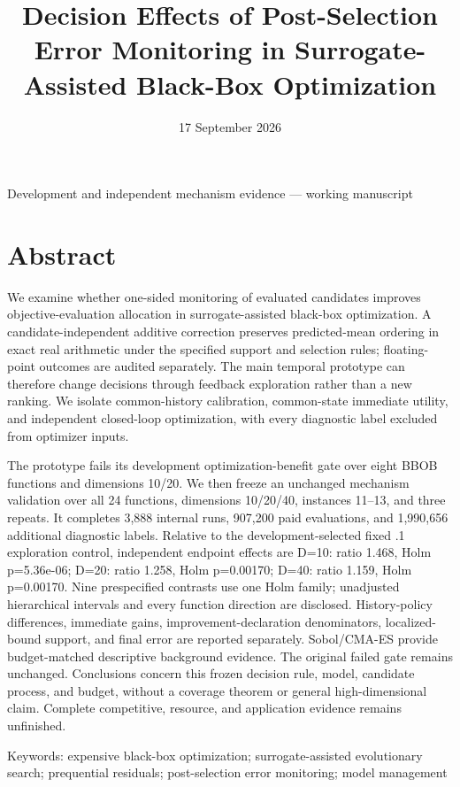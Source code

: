 \documentclass[11pt,a4paper]{article}
\title{Decision Effects of Post-Selection Error Monitoring in
Surrogate-Assisted Black-Box Optimization}
\author{}
\date{17 September 2026}
\begin{document}
\maketitle
\begin{center}Development and independent mechanism evidence --- working
manuscript\end{center}
\hypertarget{abstract}{%
\section{Abstract}\label{abstract}}

We examine whether one-sided monitoring of evaluated candidates improves
objective-evaluation allocation in surrogate-assisted black-box
optimization. A candidate-independent additive correction preserves
predicted-mean ordering in exact real arithmetic under the specified
support and selection rules; floating-point outcomes are audited
separately. The main temporal prototype can therefore change decisions
through feedback exploration rather than a new ranking. We isolate
common-history calibration, common-state immediate utility, and
independent closed-loop optimization, with every diagnostic label
excluded from optimizer inputs.

The prototype fails its development optimization-benefit gate over eight
BBOB functions and dimensions 10/20. We then freeze an unchanged
mechanism validation over all 24 functions, dimensions 10/20/40,
instances 11--13, and three repeats. It completes 3,888 internal runs,
907,200 paid evaluations, and 1,990,656 additional diagnostic labels.
Relative to the development-selected fixed .1 exploration control,
independent endpoint effects are D=10: ratio 1.468, Holm p=5.36e-06;
D=20: ratio 1.258, Holm p=0.00170; D=40: ratio 1.159, Holm p=0.00170.
Nine prespecified contrasts use one Holm family; unadjusted hierarchical
intervals and every function direction are disclosed. History-policy
differences, immediate gains, improvement-declaration denominators,
localized-bound support, and final error are reported separately.
Sobol/CMA-ES provide budget-matched descriptive background evidence. The
original failed gate remains unchanged. Conclusions concern this frozen
decision rule, model, candidate process, and budget, without a coverage
theorem or general high-dimensional claim. Complete competitive,
resource, and application evidence remains unfinished.

Keywords: expensive black-box optimization; surrogate-assisted
evolutionary search; prequential residuals; post-selection error
monitoring; model management
\end{document}
